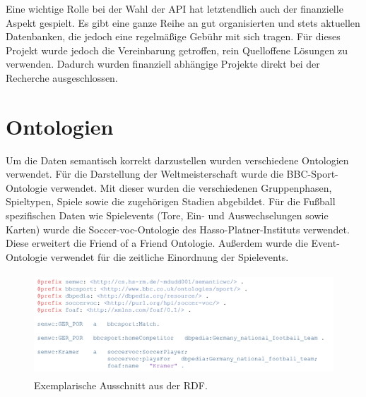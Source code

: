 \documentclass[runningheads,a4paper]{llncs}
\begin{document}
Eine wichtige Rolle bei der Wahl der API hat letztendlich auch der finanzielle Aspekt gespielt. Es gibt eine ganze Reihe an gut organisierten und stets aktuellen Datenbanken, die jedoch eine regelmäßige Gebühr mit sich tragen. Für dieses Projekt wurde jedoch die Vereinbarung getroffen, rein Quelloffene Lösungen zu verwenden. Dadurch wurden finanziell abhängige Projekte direkt bei der Recherche ausgeschlossen. 
  
\section{Ontologien}
Um die Daten semantisch korrekt darzustellen wurden verschiedene Ontologien verwendet. Für die Darstellung der Weltmeisterschaft wurde die BBC-Sport-Ontologie verwendet. Mit dieser wurden die verschiedenen Gruppenphasen, Spieltypen, Spiele sowie die zugehörigen Stadien abgebildet. Für die Fußball spezifischen Daten wie Spielevents (Tore, Ein- und Auswechselungen sowie Karten) wurde die Soccer-voc-Ontologie des Hasso-Platner-Instituts verwendet. Diese erweitert die Friend of a Friend Ontologie. Außerdem wurde die Event-Ontologie verwendet für die zeitliche Einordnung der Spielevents.\\
 

\begin{figure}
\centering
\includegraphics[height=3.8cm]{turtle}
\caption{Exemplarische Ausschnitt aus der RDF.}
\label{fig:turtlerdf}
\end{figure}


\end{document}
